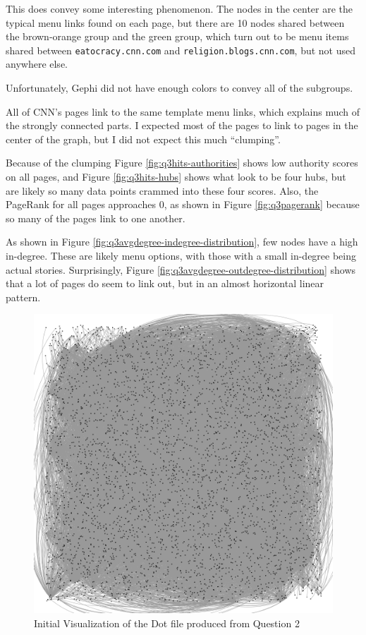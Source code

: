 \documentclass[letterpaper,11pt]{article}
\begin{document}
This does convey some interesting phenomenon.  The nodes in the center are the typical menu links found on each page, but there are 10 nodes shared between the brown-orange group and the green group, which turn out to be menu items shared between \verb+eatocracy.cnn.com+ and \verb+religion.blogs.cnn.com+, but not used anywhere else.

Unfortunately, Gephi did not have enough colors to convey all of the subgroups.

All of CNN's pages link to the same template menu links, which explains much of the strongly connected parts.  I expected most of the pages to link to pages in the center of the graph, but I did not expect this much ``clumping''.

Because of the clumping Figure \ref{fig:q3hits-authorities} shows low authority scores on all pages, and Figure \ref{fig:q3hits-hubs} shows what look to be four hubs, but are likely so many data points crammed into these four scores.  Also, the PageRank for all pages approaches $0$, as shown in Figure \ref{fig:q3pagerank} because so many of the pages link to one another.

As shown in Figure \ref{fig:q3avgdegree-indegree-distribution}, few nodes have a high in-degree.  These are likely menu options, with those with a small in-degree being actual stories.  Surprisingly, Figure \ref{fig:q3avgdegree-outdegree-distribution} shows that a lot of pages do seem to link out, but in an almost horizontal linear pattern.



\begin{figure}[p]
\includegraphics[scale=0.3]{q3/Visualized/visualized.png}
\caption{Initial Visualization of the Dot file produced from Question 2}
\label{fig:q3vis-hairball}
\end{figure}
\end{document}
